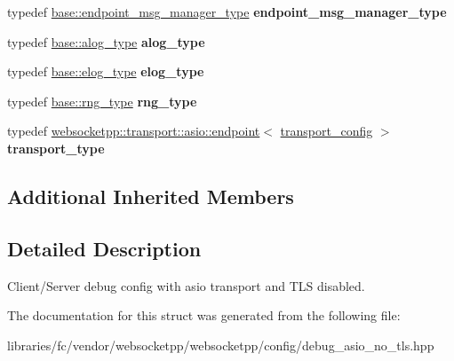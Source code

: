 \begin{DoxyCompactItemize}
\item 
\mbox{\label{structwebsocketpp_1_1config_1_1debug__asio_a55481a7cdef8ea9aef21c4498abf5544}} 
typedef \mbox{\hyperlink{classwebsocketpp_1_1message__buffer_1_1alloc_1_1endpoint__msg__manager}{base\+::endpoint\+\_\+msg\+\_\+manager\+\_\+type}} {\bfseries endpoint\+\_\+msg\+\_\+manager\+\_\+type}
\item 
\mbox{\label{structwebsocketpp_1_1config_1_1debug__asio_a08d4d37527b8126eebf4baf4b277e04f}} 
typedef \mbox{\hyperlink{classwebsocketpp_1_1log_1_1basic}{base\+::alog\+\_\+type}} {\bfseries alog\+\_\+type}
\item 
\mbox{\label{structwebsocketpp_1_1config_1_1debug__asio_a05c9a14cdc8cab4614caebf24a409364}} 
typedef \mbox{\hyperlink{structwebsocketpp_1_1config_1_1debug__core_acfa1ded7f80d6a7276b0ec3fd0859fc3}{base\+::elog\+\_\+type}} {\bfseries elog\+\_\+type}
\item 
\mbox{\label{structwebsocketpp_1_1config_1_1debug__asio_a9791c89350a790dd652cd7944cde3a3d}} 
typedef \mbox{\hyperlink{structwebsocketpp_1_1config_1_1debug__core_ae59c72992beaef76957c8bfe407394e8}{base\+::rng\+\_\+type}} {\bfseries rng\+\_\+type}
\item 
\mbox{\label{structwebsocketpp_1_1config_1_1debug__asio_a336ec3195f646c6b3c5d344beb9dc5b7}} 
typedef \mbox{\hyperlink{classwebsocketpp_1_1transport_1_1asio_1_1endpoint}{websocketpp\+::transport\+::asio\+::endpoint}}$<$ \mbox{\hyperlink{structwebsocketpp_1_1config_1_1debug__asio_1_1transport__config}{transport\+\_\+config}} $>$ {\bfseries transport\+\_\+type}
\end{DoxyCompactItemize}
\subsection*{Additional Inherited Members}


\subsection{Detailed Description}
Client/\+Server debug config with asio transport and T\+LS disabled. 

The documentation for this struct was generated from the following file\+:\begin{DoxyCompactItemize}
\item 
libraries/fc/vendor/websocketpp/websocketpp/config/debug\+\_\+asio\+\_\+no\+\_\+tls.\+hpp\end{DoxyCompactItemize}
